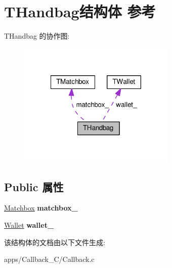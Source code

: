 \hypertarget{struct_t_handbag}{\section{T\+Handbag结构体 参考}
\label{struct_t_handbag}
}


T\+Handbag 的协作图\+:
\nopagebreak
\begin{figure}[H]
\begin{center}
\leavevmode
\includegraphics[width=213pt]{struct_t_handbag__coll__graph}
\end{center}
\end{figure}
\subsection*{Public 属性}
\begin{DoxyCompactItemize}
\item 
\hypertarget{struct_t_handbag_aca5d0e36d83c2d1ddc2be3748b0d7bf5}{\hyperlink{struct_t_matchbox}{Matchbox} {\bfseries matchbox\+\_\+}}\label{struct_t_handbag_aca5d0e36d83c2d1ddc2be3748b0d7bf5}

\item 
\hypertarget{struct_t_handbag_a59be0d891f040d98c8148f440ad0ca21}{\hyperlink{struct_t_wallet}{Wallet} {\bfseries wallet\+\_\+}}\label{struct_t_handbag_a59be0d891f040d98c8148f440ad0ca21}

\end{DoxyCompactItemize}


该结构体的文档由以下文件生成\+:\begin{DoxyCompactItemize}
\item 
apps/\+Callback\+\_\+\+C/Callback.\+c\end{DoxyCompactItemize}
